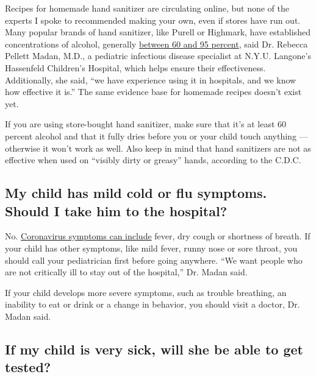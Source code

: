 Recipes for homemade hand sanitizer are circulating online, but none of
the experts I spoke to recommended making your own, even if stores have
run out. Many popular brands of hand sanitizer, like Purell or Highmark,
have established concentrations of alcohol, generally
\href{https://www.cdc.gov/handwashing/show-me-the-science-hand-sanitizer.html}{between
60 and 95 percent}, said Dr. Rebecca Pellett Madan, M.D., a pediatric
infectious disease specialist at N.Y.U. Langone's Hassenfeld Children's
Hospital, which helps ensure their effectiveness. Additionally, she
said, ``we have experience using it in hospitals, and we know how
effective it is.'' The same evidence base for homemade recipes doesn't
exist yet.

If you are using store-bought hand sanitizer, make sure that it's at
least 60 percent alcohol and that it fully dries before you or your
child touch anything --- otherwise it won't work as well. Also keep in
mind that hand sanitizers are not as effective when used on ``visibly
dirty or greasy'' hands, according to the C.D.C.

\hypertarget{my-child-has-mild-cold-or-flu-symptoms-should-i-take-him-to-the-hospital}{%
\subsection{My child has mild cold or flu symptoms. Should I take him to
the
hospital?}\label{my-child-has-mild-cold-or-flu-symptoms-should-i-take-him-to-the-hospital}}

No.
\href{https://www.cdc.gov/coronavirus/2019-ncov/downloads/COVID19-symptoms.pdf}{Coronavirus
symptoms can include} fever, dry cough or shortness of breath. If your
child has other symptoms, like mild fever, runny nose or sore throat,
you should call your pediatrician first before going anywhere. ``We want
people who are not critically ill to stay out of the hospital,'' Dr.
Madan said.

If your child develops more severe symptoms, such as trouble breathing,
an inability to eat or drink or a change in behavior, you should visit a
doctor, Dr. Madan said.

\hypertarget{if-my-child-is-very-sick-will-she-be-able-to-get-tested}{%
\subsection{If my child is very sick, will she be able to get
tested?}\label{if-my-child-is-very-sick-will-she-be-able-to-get-tested}}


